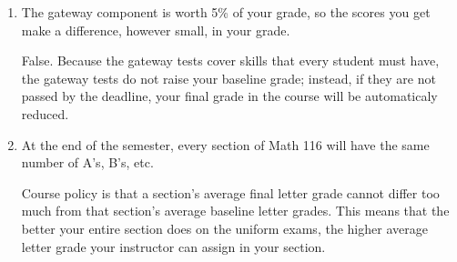 \documentclass[11pt,letterpaper]{article}
\begin{document}
\begin{enumerate}
\item The gateway component is worth 5\% of your grade, so the scores you get make a difference, however small, in your grade. 

\vspace{.5pc} 
False.  Because the gateway tests cover skills that every student must have, the gateway tests do not raise your baseline grade; instead, if they are not passed by the deadline, your final grade in the course will be automaticaly reduced.

\item  At the end of the semester, every section of Math 116 will have the same number of A's, B's, etc.

\vspace{.5pc}
Course policy is that a section's average final letter grade cannot differ too much from that section's average baseline letter grades.  This means that the better your entire section does on the uniform exams, the higher average letter grade your instructor can assign in your section.

\end{enumerate}
\end{document}
